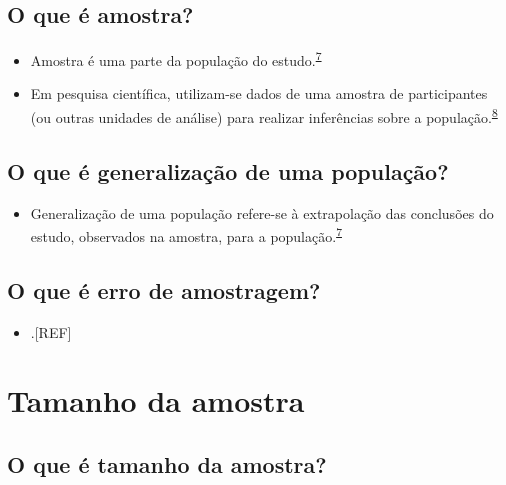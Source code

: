 \documentclass[
  a4paper,
]{book}
\providecommand{\tightlist}{%
  \setlength{\itemsep}{0pt}\setlength{\parskip}{0pt}}
\begin{document}
\hypertarget{o-que-uxe9-amostra}{%
\subsection{O que é amostra?}\label{o-que-uxe9-amostra}}

\begin{itemize}
\item
  Amostra é uma parte da população do estudo.\textsuperscript{\protect\hyperlink{ref-Banerjee2010}{7}}
\item
  Em pesquisa científica, utilizam-se dados de uma amostra de participantes (ou outras unidades de análise) para realizar inferências sobre a população.\textsuperscript{\protect\hyperlink{ref-Bland2015}{8}}
\end{itemize}

\hypertarget{o-que-uxe9-generalizauxe7uxe3o-de-uma-populauxe7uxe3o}{%
\subsection{O que é generalização de uma população?}\label{o-que-uxe9-generalizauxe7uxe3o-de-uma-populauxe7uxe3o}}

\begin{itemize}
\tightlist
\item
  Generalização de uma população refere-se à extrapolação das conclusões do estudo, observados na amostra, para a população.\textsuperscript{\protect\hyperlink{ref-Banerjee2010}{7}}
\end{itemize}

\hypertarget{o-que-uxe9-erro-de-amostragem}{%
\subsection{O que é erro de amostragem?}\label{o-que-uxe9-erro-de-amostragem}}

\begin{itemize}
\tightlist
\item
  .{[}REF{]}
\end{itemize}

\hypertarget{tamanho-da-amostra}{%
\section{Tamanho da amostra}\label{tamanho-da-amostra}}

\hypertarget{o-que-uxe9-tamanho-da-amostra}{%
\subsection{O que é tamanho da amostra?}\label{o-que-uxe9-tamanho-da-amostra}}
\end{document}
